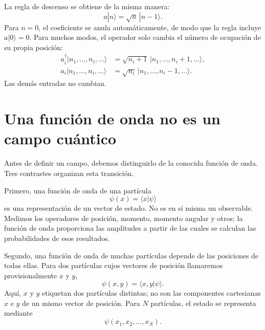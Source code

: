 \begin{classroomqa}
\end{classroomqa}

La regla de descenso se obtiene de la misma manera:
\begin{equation}
a|n\rangle=\sqrt n\,|n-1\rangle.
\label{eq:l06-lowering-rule}
\end{equation}
Para \(n=0\), el coeficiente se anula automáticamente, de modo que la regla incluye \(a|0\rangle=0\). Para muchos modos, el operador solo cambia el número de ocupación de su propia posición:
\begin{align}
a_i^\dagger|n_1,\ldots,n_i,\ldots\rangle
&=\sqrt{n_i+1}\,|n_1,\ldots,n_i+1,\ldots\rangle, \\
a_i|n_1,\ldots,n_i,\ldots\rangle
&=\sqrt{n_i}\,|n_1,\ldots,n_i-1,\ldots\rangle.
\label{eq:l06-multimode-ladders}
\end{align}
Las demás entradas no cambian.

\section{Una función de onda no es un campo cuántico}

Antes de definir un campo, debemos distinguirlo de la conocida función de onda. Tres contrastes organizan esta transición.

Primero, una función de onda de una partícula
\begin{equation}
\psi(x)=\langle x|\psi\rangle
\end{equation}
es una representación de un vector de estado. No es en sí misma un observable. Medimos los operadores de posición, momento, momento angular y otros; la función de onda proporciona las amplitudes a partir de las cuales se calculan las probabilidades de esos resultados.

Segundo, una función de onda de muchas partículas depende de las posiciones de todas ellas. Para dos partículas cujos vectores de posición llamaremos provisionalmente \(x\) y \(y\),
\begin{equation}
\psi(x,y)=\langle x,y|\psi\rangle.
\end{equation}
Aquí, \(x\) y \(y\) etiquetan dos partículas distintas; no son las componentes cartesianas \(x\) e \(y\) de un mismo vector de posición. Para \(N\) partículas, el estado se representa mediante
\begin{equation}
\psi(x_1,x_2,\ldots,x_N).
\end{equation}

